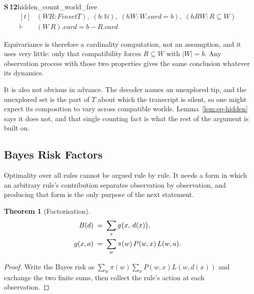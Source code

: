 \documentclass[conference]{IEEEtran}
\newtheorem{theorem}{Theorem}
\theoremstyle{definition}
\newcommand{\lean}[1]{\textsf{\footnotesize #1}}
\begin{document}
\noindent\textbf{S\,12}\quad\lean{hidden\_count\_world\_free}
{\footnotesize\[ \begin{aligned}[t]
&(\mathit{W} \mathit{R} : \mathit{Finset} \mathit{T}),\; (\mathit{b} : \mathbb{N} ),\; (\mathit{hW} : \mathit{W}.\mathit{card} = \mathit{b}),\; (\mathit{hRW} : \mathit{R} \subseteq \mathit{W})\\
\vdash\;&(\mathit{W} \ \mathit{R}).\mathit{card} = \mathit{b} - \mathit{R}.\mathit{card}
\end{aligned} \]}


Equivariance is therefore a cardinality computation, not an assumption, and it uses very
little: only that compatibility forces $R\subseteq W$ with $|W|=b$. Any observation process
with those two properties gives the same conclusion whatever its dynamics.

It is also not obvious in advance. The decoder names an unexplored tip, and the unexplored set
is the part of $T$ about which the transcript is silent, so one might expect its composition
to vary across compatible worlds. Lemma~\ref{lem:sp-hidden} says it does not, and that single
counting fact is what the rest of the argument is built on.

\subsection{Bayes Risk Factors}
\label{sec:sp-bayes}

Optimality over all rules cannot be argued rule by rule. It needs a form in which an arbitrary
rule's contribution separates observation by observation, and producing that form is the only
purpose of the next statement.

\begin{theorem}[Factorisation]
\label{thm:sp-factor}
\begin{align}
B(d)&\;=\;\sum_{x} g\bigl(x,\,d(x)\bigr),\notag\\
g(x,a)&\;=\;\sum_{w}\pi(w)\,P(w,x)\,L(w,a).
\label{eq:sp-bayes}
\end{align}
\end{theorem}

\begin{proof}
Write the Bayes risk as $\sum_{w}\pi(w)\sum_{x}P(w,x)L(w,d(x))$ and exchange the two finite
sums, then collect the rule's action at each observation.
\end{proof}
\end{document}
